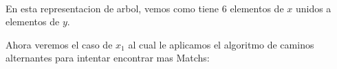\documentclass[letterpaper,10pt]{article}
\begin{document}
\begin{enumerate}[1.]
\begin{minipage}[t]{0.6\textwidth}
\begin{tikzpicture}[x=0.75pt,y=0.75pt,yscale=-1,xscale=1]
\end{tikzpicture}

\end{minipage}\\
En esta representacion de arbol, vemos como tiene 6 elementos de $x$ unidos a elementos de $y$.\\
\newline



Ahora veremos el caso de $x_{1}$ al cual le aplicamos el algoritmo de caminos alternantes para intentar encontrar mas Matchs:
\\
\newline
\begin{minipage}[t]{0.6\textwidth}



\begin{tikzpicture}[x=0.6pt,y=0.6pt,yscale=-0.9,xscale=0.9]


\end{tikzpicture}
\end{minipage}
\end{enumerate}
\end{document}
